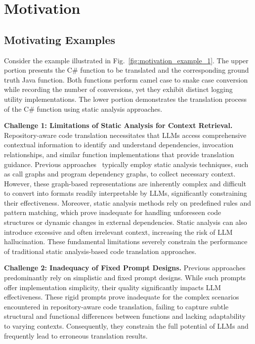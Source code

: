 \section{Motivation}

\subsection{Motivating Examples}
Consider the example illustrated in Fig.~\ref{fig:motivation_example_1}. The upper portion presents the C\# function to be translated and the corresponding ground truth Java function. Both functions perform camel case to snake case conversion while recording the number of conversions, yet they exhibit distinct logging utility implementations. The lower portion demonstrates the translation process of the C\# function using static analysis approaches.

\textbf{Challenge 1: Limitations of Static Analysis for Context Retrieval.}
Repository-aware code translation necessitates that LLMs access comprehensive contextual information to identify and understand dependencies, invocation relationships, and similar function implementations that provide translation guidance. Previous approaches~\cite{ou2024repository,wang2024repotransbench} typically employ static analysis techniques, such as call graphs and program dependency graphs, to collect necessary context. However, these graph-based representations are inherently complex and difficult to convert into formats readily interpretable by LLMs, significantly constraining their effectiveness. Moreover, static analysis methods rely on predefined rules and pattern matching, which prove inadequate for handling unforeseen code structures or dynamic changes in external dependencies. Static analysis can also introduce excessive and often irrelevant context, increasing the risk of LLM hallucination. These fundamental limitations severely constrain the performance of traditional static analysis-based code translation approaches.

\textbf{Challenge 2: Inadequacy of Fixed Prompt Designs.}
Previous approaches~\cite{yin2024rectifier,khan2024xcodeeval,macedo2024exploring,pan2024lost,yang2024exploring} predominantly rely on simplistic and fixed prompt designs. While such prompts offer implementation simplicity, their quality significantly impacts LLM effectiveness. These rigid prompts prove inadequate for the complex scenarios encountered in repository-aware code translation, failing to capture subtle structural and functional differences between functions and lacking adaptability to varying contexts. Consequently, they constrain the full potential of LLMs and frequently lead to erroneous translation results.

